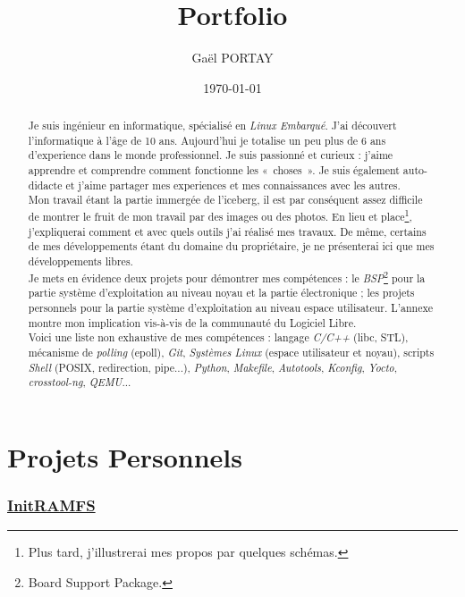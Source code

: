 \documentclass[a4paper]{article}
\title{Portfolio}
\author{Gaël PORTAY}
\date{\today}
\begin{document}
\maketitle

\begin{abstract}
Je suis ingénieur en informatique, spécialisé en \textit{Linux Embarqué}. J'ai découvert l'informatique à l'âge de 10 ans. Aujourd'hui je totalise un peu plus de 6 ans d'experience dans le monde professionnel. Je suis passionné et curieux : j'aime apprendre et comprendre comment fonctionne les «~choses~». Je suis également auto-didacte et j'aime partager mes experiences et mes connaissances avec les autres.\\

Mon travail étant la partie immergée de l'iceberg, il est par conséquent assez difficile de montrer le fruit de mon travail par des images ou des photos. En lieu et place\footnote{Plus tard, j'illustrerai mes propos par quelques schémas.}, j'expliquerai comment et avec quels outils j'ai réalisé mes travaux. De même, certains de mes développements étant du domaine du propriétaire, je ne présenterai ici que mes développements libres.\\

Je mets en évidence deux projets pour démontrer mes compétences : le \textit{BSP}\footnote{Board Support Package.} pour la partie système d'exploitation au niveau noyau et la partie électronique ; les projets personnels pour la partie système d'exploitation au niveau espace utilisateur. L'annexe montre mon implication vis-à-vis de la communauté du Logiciel Libre.\\

Voici une liste non exhaustive de mes compétences : langage \textit{C/C++} (libc, STL), mécanisme de \textit{polling} (epoll), \textit{Git}, \textit{Systèmes Linux} (espace utilisateur et noyau), scripts \textit{Shell} (POSIX, redirection, pipe...), \textit{Python}, \textit{Makefile}, \textit{Autotools}, \textit{Kconfig}, \textit{Yocto}, \textit{crosstool-ng}, \textit{QEMU}...
\end{abstract}
\clearpage

\tableofcontents
\clearpage

\part{Projets Personnels}

\section{\href{https://github.com/gazoo74/initramfs/}{InitRAMFS}}
\end{document}
